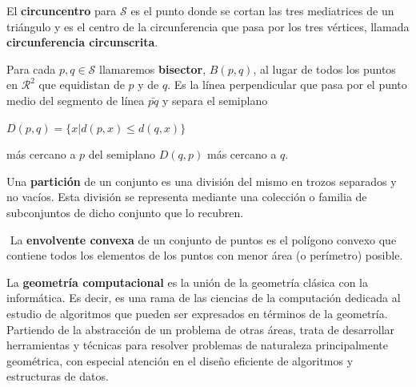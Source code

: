 \begin{definicion}
    El \textbf{circuncentro} para $\mathcal{S}$ es el punto donde se cortan las tres mediatrices de un triángulo y es el centro de la circunferencia que pasa por los tres vértices, llamada  \textbf{circunferencia circunscrita}.
\end{definicion}
\vspace{0.3cm}

\begin{definicion}	
    Para cada $p,q \in \mathcal{S}$ llamaremos \textbf{bisector}, $B(p,q)$, al lugar de todos los puntos en $\mathcal{R}^{2}$ que equidistan de $p$ y de $q$. Es la línea perpendicular que pasa por el punto medio del segmento de línea $\bar{pq}$ y separa el semiplano 
    \begin{center} $D(p,q) = \lbrace x  |  d(p,x) \leq d(q,x)\rbrace$ \end{center} más cercano a $p$ del semiplano $D(q,p)$ más cercano a $q$.
\end{definicion}
\vspace{0.3cm}

\begin{definicion}
    Una \textbf{partición} de un conjunto es una división del mismo en trozos separados y no vacíos. Esta división se representa mediante una colección o familia de subconjuntos de dicho conjunto que lo recubren.
\end{definicion}
\vspace{0.3cm}

\begin{definicion}$\label{envolvente}$
    La \textbf{envolvente convexa} de un conjunto de puntos es el polígono convexo que contiene todos los elementos de los puntos con menor área (o perímetro) posible.
\end{definicion}
\vspace{0.3cm}

\begin{definicion}
    La \textbf{geometría computacional} es la unión de la geometría clásica con la informática. Es decir, es una rama de las ciencias de la computación dedicada al estudio de algoritmos que pueden ser expresados en términos de la geometría. Partiendo de la abstracción de un problema de otras áreas, trata de desarrollar herramientas y técnicas para resolver problemas de naturaleza principalmente geométrica, con especial atención en el diseño eficiente de algoritmos y estructuras de datos.
\end{definicion}
\vspace{0.3cm}

